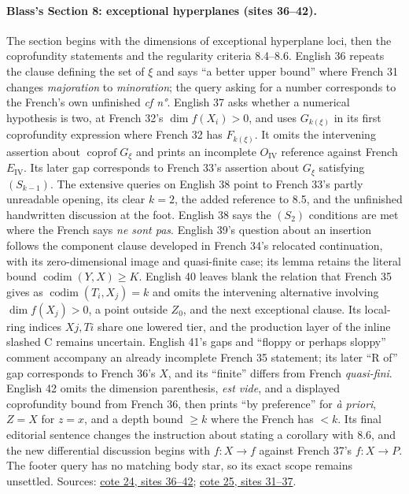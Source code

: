 \paragraph{Blass's Section 8: exceptional hyperplanes (sites 36--42).}
The section begins with the dimensions of exceptional hyperplane loci, then the coprofundity statements and the regularity criteria 8.4--8.6. English 36 repeats the clause defining the set of $\xi$ and says ``a better upper bound'' where French 31 changes \emph{majoration} to \emph{minoration}; the query asking for a number corresponds to the French's own unfinished \emph{cf n°}. English 37 asks whether a numerical hypothesis is two, at French 32's $\dim f(X_i)>0$, and uses $G_{k(\xi)}$ in its first coprofundity expression where French 32 has $F_{k(\xi)}$. It omits the intervening assertion about $\operatorname{coprof}G_\xi$ and prints an incomplete $O_{\mathrm{IV}}$ reference against French $E_{\mathrm{IV}}$. Its later gap corresponds to French 33's assertion about $G_\xi$ satisfying $(S_{k-1})$. The extensive queries on English 38 point to French 33's partly unreadable opening, its clear $k=2$, the added reference to 8.5, and the unfinished handwritten discussion at the foot. English 38 says the $(S_2)$ conditions are met where the French says \emph{ne sont pas}. English 39's question about an insertion follows the component clause developed in French 34's relocated continuation, with its zero-dimensional image and quasi-finite case; its lemma retains the literal bound $\operatorname{codim}(Y,X)\geq K$. English 40 leaves blank the relation that French 35 gives as $\operatorname{codim}(T_i,X_j)=k$ and omits the intervening alternative involving $\dim f(X_j)>0$, a point outside $Z_0$, and the next exceptional clause. Its local-ring indices $Xj,Ti$ share one lowered tier, and the production layer of the inline slashed C remains uncertain. English 41's gaps and ``floppy or perhaps sloppy'' comment accompany an already incomplete French 35 statement; its later ``R of'' gap corresponds to French 36's $X$, and its ``finite'' differs from French \emph{quasi-fini}. English 42 omits the dimension parenthesis, \emph{est vide}, and a displayed coprofundity bound from French 36, then prints ``by preference'' for \emph{à priori}, $Z=X$ for $z=x$, and a depth bound $\geq k$ where the French has $<k$. Its final editorial sentence changes the instruction about stating a corollary with 8.6, and the new differential discussion begins with $f:X\to f$ against French 37's $f:X\to P$. The footer query has no matching body star, so its exact scope remains unsettled. Sources: \href{https://grothendieck.umontpellier.fr/web/viewer.html?file=../24.pdf\#page=37}{cote 24, sites 36--42}; \href{https://grothendieck.umontpellier.fr/web/viewer.html?file=../25.pdf\#page=32}{cote 25, sites 31--37}.

